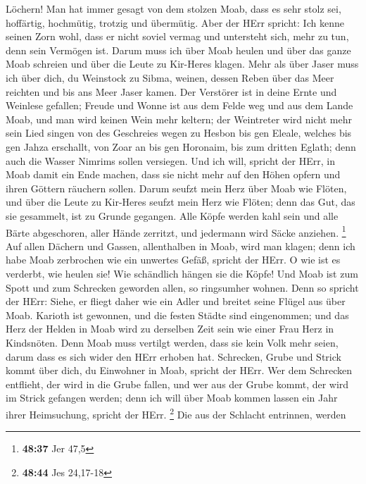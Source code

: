 Löchern!  Man hat immer gesagt von dem stolzen Moab, dass
es sehr stolz sei, hoffärtig, hochmütig, trotzig und übermütig.
 Aber der HErr spricht: Ich kenne seinen Zorn wohl, dass er
nicht soviel vermag und untersteht sich, mehr zu tun, denn sein Vermögen
ist.  Darum muss ich über Moab heulen und über das ganze
Moab schreien und über die Leute zu Kir-Heres klagen.  Mehr
als über Jaser muss ich über dich, du Weinstock zu Sibma, weinen, dessen
Reben über das Meer reichten und bis ans Meer Jaser kamen. Der Verstörer
ist in deine Ernte und Weinlese gefallen;  Freude und Wonne
ist aus dem Felde weg und aus dem Lande Moab, und man wird keinen Wein
mehr keltern; der Weintreter wird nicht mehr sein Lied singen
 von des Geschreies wegen zu Hesbon bis gen Eleale, welches
bis gen Jahza erschallt, von Zoar an bis gen Horonaim, bis zum dritten
Eglath; denn auch die Wasser Nimrims sollen versiegen.  Und
ich will, spricht der HErr, in Moab damit ein Ende machen, dass sie
nicht mehr auf den Höhen opfern und ihren Göttern räuchern sollen.
 Darum seufzt mein Herz über Moab wie Flöten, und über die
Leute zu Kir-Heres seufzt mein Herz wie Flöten; denn das Gut, das sie
gesammelt, ist zu Grunde gegangen.  Alle Köpfe werden kahl
sein und alle Bärte abgeschoren, aller Hände zerritzt, und jedermann
wird Säcke anziehen. \footnote{\textbf{48:37} Jer 47,5} 
Auf allen Dächern und Gassen, allenthalben in Moab, wird man klagen;
denn ich habe Moab zerbrochen wie ein unwertes Gefäß, spricht der HErr.
 O wie ist es verderbt, wie heulen sie! Wie schändlich
hängen sie die Köpfe! Und Moab ist zum Spott und zum Schrecken geworden
allen, so ringsumher wohnen.  Denn so spricht der HErr:
Siehe, er fliegt daher wie ein Adler und breitet seine Flügel aus über
Moab.  Karioth ist gewonnen, und die festen Städte sind
eingenommen; und das Herz der Helden in Moab wird zu derselben Zeit sein
wie einer Frau Herz in Kindsnöten.  Denn Moab muss vertilgt
werden, dass sie kein Volk mehr seien, darum dass es sich wider den HErr
erhoben hat.  Schrecken, Grube und Strick kommt über dich,
du Einwohner in Moab, spricht der HErr.  Wer dem Schrecken
entflieht, der wird in die Grube fallen, und wer aus der Grube kommt,
der wird im Strick gefangen werden; denn ich will über Moab kommen
lassen ein Jahr ihrer Heimsuchung, spricht der HErr. \footnote{\textbf{48:44}
  Jes 24,17-18}  Die aus der Schlacht entrinnen, werden
